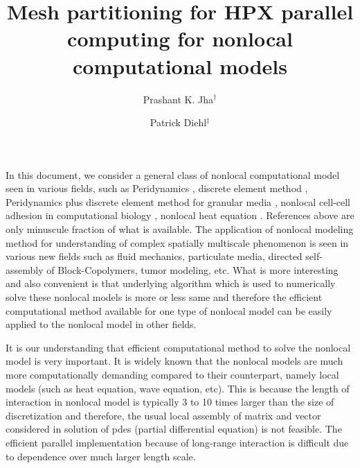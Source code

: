 \documentclass[11pt,twocolumn]{amsart}
\makeatletter
\renewcommand{\email}[2][]{%
	\ifx\emails\@empty\relax\else{\g@addto@macro\emails{,\space}}\fi%
	\@ifnotempty{#1}{\g@addto@macro\emails{\textrm{(#1)}\space}}%
	\g@addto@macro\emails{#2}%
}
\theoremstyle{definition}
\theoremstyle{definition}
\numberwithin{equation}{section}
\numberwithin{equation}{section}
\makeatother
\begin{document}
\title{Mesh partitioning for HPX parallel computing for nonlocal computational models}

\author{Prashant K. Jha$^\dagger$}


\address[$\dagger$]{Oden Institute for Computational Engineering and Sciences, \\
The University of Texas at Austin, \\
Austin, TX 78712, USA}
\email[$\dagger$]{pjha.sci@gmail.com}

\author{Patrick Diehl$^\ddagger$}

\address[$\ddagger$]{Center for Computation and Technology, \\
	Louisiana State University, \\
	Baton Rouge, LA 70803 USA}
\email[$\ddagger$]{pdiehl@cct.lsu.edu}

\maketitle

In this document, we consider a general class of nonlocal computational model seen in various fields, such as Peridynamics \cite{CMPer-Silling5,BobaruHu,HaBobaru,CMPer-Agwai,CMPer-Ghajari,Diehl,CMPer-Lipton2,CMPer-JhaLipton2,CMPer-JhaLipton5}, discrete element method \cite{NM-Desai,NM-Desai2,NM-Gladkyy,NM-Lobo,NM-Dosta}, Peridynamics plus discrete element method for granular media \cite{NM-Zhu, NM-Masoud}, nonlocal cell-cell adhesion in computational biology \cite{armstrong2006continuum,engwer2017structured,stinner2014global}, nonlocal heat equation \cite{burch2011classical,du2012analysis}. References above are only minuscule fraction of what is available. The application of nonlocal modeling method for understanding of complex spatially multiscale phenomenon is seen in various new fields such as fluid mechanics, particulate media, directed self-assembly of Block-Copolymers, tumor modeling, etc. What is more interesting and also convenient is that underlying algorithm which is used to numerically solve these nonlocal models is more or less same and therefore the efficient computational method available for one type of nonlocal model can be easily applied to the nonlocal model in other fields.

It is our understanding that efficient computational method to solve the nonlocal model is very important. It is widely known that the nonlocal models are much more computationally demanding compared to their counterpart, namely local models (such as heat equation, wave equation, etc). This is because the length of interaction in nonlocal model is typically 3 to 10 times larger than the size of discretization and therefore, the usual local assembly of matrix and vector considered in solution of pdes (partial differential equation) is not feasible. The efficient parallel implementation because of long-range interaction is difficult due to dependence over much larger length scale. 
\end{document}
